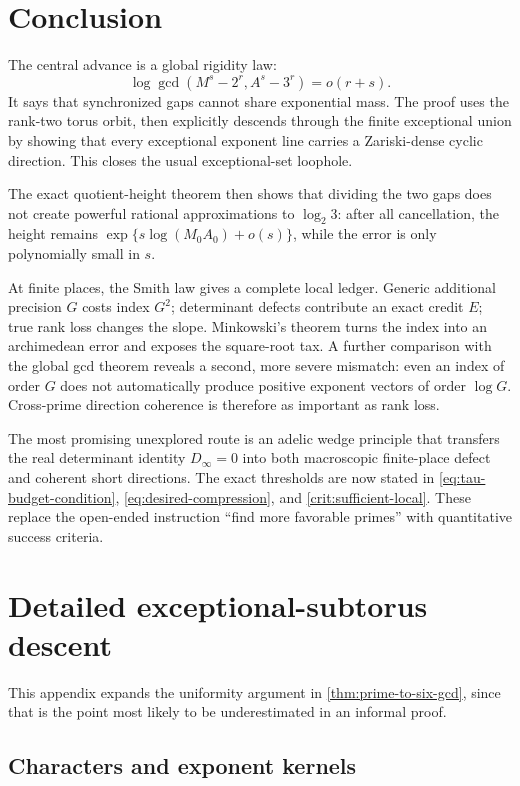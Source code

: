 \documentclass[11pt,oneside]{article}
\theoremstyle{definition}
\begin{document}
\section{Conclusion}\label{sec:conclusion}

The central advance is a global rigidity law:
\[
  \log\gcd(M^s-2^r,A^s-3^r)=o(r+s).
\]
It says that synchronized gaps cannot share exponential mass.  The proof
uses the rank-two torus orbit, then explicitly descends through the finite
exceptional union by showing that every exceptional exponent line carries
a Zariski-dense cyclic direction.  This closes the usual exceptional-set
loophole.

The exact quotient-height theorem then shows that dividing the two gaps
does not create powerful rational approximations to $\log_2 3$: after all
cancellation, the height remains
$\exp\{s\log(M_0A_0)+o(s)\}$, while the error is only polynomially small
in $s$.

At finite places, the Smith law gives a complete local ledger.  Generic
additional precision $G$ costs index $G^2$; determinant defects contribute
an exact credit $E$; true rank loss changes the slope.  Minkowski's theorem
turns the index into an archimedean error and exposes the square-root tax.
A further comparison with the global gcd theorem reveals a second, more
severe mismatch: even an index of order $G$ does not automatically produce
positive exponent vectors of order $\log G$.  Cross-prime direction
coherence is therefore as important as rank loss.

The most promising unexplored route is an adelic wedge principle that
transfers the real determinant identity $D_\infty=0$ into both
macroscopic finite-place defect and coherent short directions.  The exact
thresholds are now stated in \eqref{eq:tau-budget-condition},
\eqref{eq:desired-compression}, and \cref{crit:sufficient-local}.  These
replace the open-ended instruction ``find more favorable primes'' with
quantitative success criteria.

\appendix

\section{Detailed exceptional-subtorus descent}\label{app:descent}

This appendix expands the uniformity argument in
\cref{thm:prime-to-six-gcd}, since that is the point most likely to be
underestimated in an informal proof.

\subsection{Characters and exponent kernels}
\end{document}
